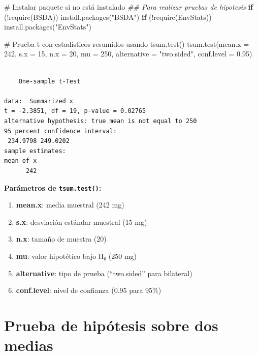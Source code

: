 \documentclass[
  spanish,
  letterpaper,
]{book}
\newenvironment{Shaded}{\begin{snugshade}}{\end{snugshade}}
\newcommand{\AttributeTok}[1]{\textcolor[rgb]{0.40,0.45,0.13}{#1}}
\newcommand{\CommentTok}[1]{\textcolor[rgb]{0.37,0.37,0.37}{#1}}
\newcommand{\ControlFlowTok}[1]{\textcolor[rgb]{0.00,0.23,0.31}{\textbf{#1}}}
\newcommand{\DecValTok}[1]{\textcolor[rgb]{0.68,0.00,0.00}{#1}}
\newcommand{\DocumentationTok}[1]{\textcolor[rgb]{0.37,0.37,0.37}{\textit{#1}}}
\newcommand{\FloatTok}[1]{\textcolor[rgb]{0.68,0.00,0.00}{#1}}
\newcommand{\FunctionTok}[1]{\textcolor[rgb]{0.28,0.35,0.67}{#1}}
\newcommand{\NormalTok}[1]{\textcolor[rgb]{0.00,0.23,0.31}{#1}}
\newcommand{\SpecialCharTok}[1]{\textcolor[rgb]{0.37,0.37,0.37}{#1}}
\newcommand{\StringTok}[1]{\textcolor[rgb]{0.13,0.47,0.30}{#1}}
\begin{document}
\begin{Shaded}
\begin{Highlighting}[]
\CommentTok{\# Instalar paquete si no está instalado}
\DocumentationTok{\#\# Para realizar pruebas de hipotesis}
\ControlFlowTok{if}\NormalTok{ (}\SpecialCharTok{!}\FunctionTok{require}\NormalTok{(BSDA)) }\FunctionTok{install.packages}\NormalTok{(}\StringTok{"BSDA"}\NormalTok{)}
\ControlFlowTok{if}\NormalTok{ (}\SpecialCharTok{!}\FunctionTok{require}\NormalTok{(EnvStats)) }\FunctionTok{install.packages}\NormalTok{(}\StringTok{"EnvStats"}\NormalTok{)}


\CommentTok{\# Prueba t con estadísticos resumidos usando tsum.test()}
\FunctionTok{tsum.test}\NormalTok{(}\AttributeTok{mean.x =} \DecValTok{242}\NormalTok{,}
          \AttributeTok{s.x =} \DecValTok{15}\NormalTok{,}
          \AttributeTok{n.x =} \DecValTok{20}\NormalTok{,}
          \AttributeTok{mu =} \DecValTok{250}\NormalTok{,}
          \AttributeTok{alternative =} \StringTok{"two.sided"}\NormalTok{,}
          \AttributeTok{conf.level =} \FloatTok{0.95}\NormalTok{)}
\end{Highlighting}
\end{Shaded}

\begin{verbatim}

    One-sample t-Test

data:  Summarized x
t = -2.3851, df = 19, p-value = 0.02765
alternative hypothesis: true mean is not equal to 250
95 percent confidence interval:
 234.9798 249.0202
sample estimates:
mean of x 
      242 
\end{verbatim}

\textbf{Parámetros de \texttt{tsum.test()}:}

\begin{enumerate}
\def\labelenumi{\arabic{enumi}.}
\item
  \textbf{mean.x}: media muestral (242 mg)
\item
  \textbf{s.x}: desviación estándar muestral (15 mg)
\item
  \textbf{n.x}: tamaño de muestra (20)
\item
  \textbf{mu}: valor hipotético bajo H₀ (250 mg)
\item
  \textbf{alternative}: tipo de prueba (``two.sided'' para bilateral)
\item
  \textbf{conf.level}: nivel de confianza (0.95 para 95\%)
\end{enumerate}

\section{Prueba de hipótesis sobre dos
medias}\label{prueba-de-hipuxf3tesis-sobre-dos-medias}
\end{document}
